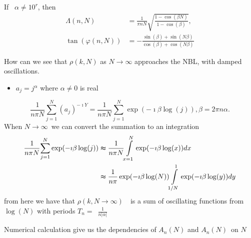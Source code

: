 \documentclass[titlepage,fleqn]{article}%
\begin{document}
If \ $\alpha\neq10^{r}$, then%
\begin{align*}
\Lambda(n,N)  &  =\frac{1}{\pi nN}\sqrt{\frac{1-\cos(\beta N)}{1-\cos(\beta)}%
},\\
\tan(\varphi(n,N))  &  =-\frac{\sin(\beta)+\sin(N\beta)}{\cos(\beta
)+\cos(N\beta)}%
\end{align*}


How can we see that $\rho(k,N)$ as $N\rightarrow\infty$ approaches the NBL,
with damped oscillations.

\begin{itemize}
\item $a_{j}=j^{\alpha}$ where $\alpha\neq0$ is real
\end{itemize}

%

\[
\frac{1}{n\pi N}%
{\displaystyle\sum\limits_{j=1}^{N}}
(a_{j})^{-\imath Y}=\frac{1}{n\pi N}%
{\displaystyle\sum\limits_{j=1}^{N}}
\exp(-\imath\beta\log(j)),\beta=2\pi n\alpha.
\]
When $N\rightarrow\infty$\ we can convert the summation to an integration%
\begin{align}
\frac{1}{n\pi N}%
{\displaystyle\sum\limits_{j=1}^{N}}
\exp(-\imath\beta\log(j))  &  \thickapprox\frac{1}{n\pi N}%
{\displaystyle\int\limits_{x=1}^{N}}
\exp(-\imath\beta\log(x))dx\\
&  \thickapprox\frac{1}{n\pi}\exp(-\imath\beta\log(N))%
{\displaystyle\int\limits_{1/N}^{1}}
\exp(-\imath\beta\log(y))dy\nonumber
\end{align}
from here we have that $\rho(k,N\rightarrow\infty)$\ \ is a sum of oscillating
functions from $\log(N)$ with periods $T_{n}=$\ $\frac{1}{n\left\vert
\alpha\right\vert }$

Numerical calculation give us the dependencies of $A_{n}(N)$ and $A_{n}%
(N)$\ on $N$

\bigskip
\end{document}
